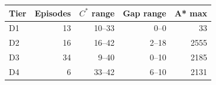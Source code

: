 \begin{tabular}{lrrrr}\toprule
Tier & Episodes & $C^*$ range & Gap range & A* max\\\midrule
D1 & 13 & 10--33 & 0--0 & 33\\
D2 & 16 & 16--42 & 2--18 & 2555\\
D3 & 34 & 9--40 & 0--10 & 2185\\
D4 & 6 & 33--42 & 6--10 & 2131\\
\bottomrule\end{tabular}
